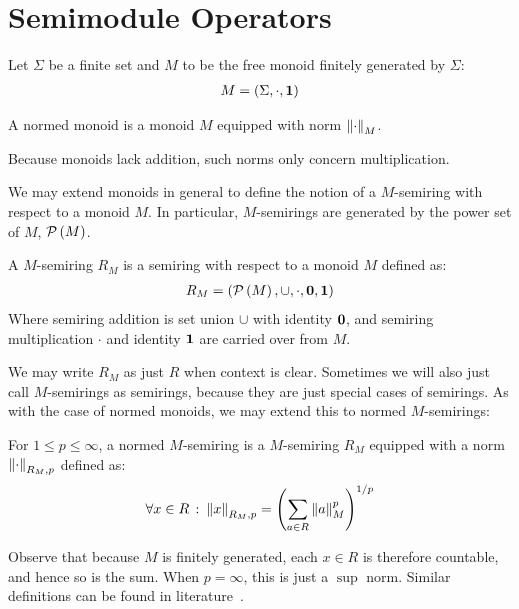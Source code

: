 
\section{Semimodule Operators}
Let \(\Sigma\) be a finite set and
\(M\) to be the free monoid finitely generated by \(\Sigma\):
\begin{align*}
  M = \left(\Sigma, \cdot, \mathbf{1}\right)
\end{align*}

\begin{definition}
  A normed monoid is a monoid \(M\) equipped with norm \(\left\lVert\cdot\right\rVert_M\).
\end{definition}

Because monoids lack addition,
such norms only concern multiplication.

We may extend monoids in general to define the notion of a \(M\)-semiring
with respect to a monoid \(M\).
In particular, \(M\)-semirings are generated by the power set of \(M\),
\(\mathcal{P}\left(M\right)\).

\begin{definition}[\(M\)-Semiring]
  A \(M\)-semiring \(R_M\) is a semiring
  with respect to a monoid \(M\) defined as:
  \begin{align*}
    R_M = \left(\mathcal{P}\left(M\right), \cup, \cdot, \mathbf{0}, \mathbf{1}\right)
  \end{align*}
  Where semiring addition is set union \(\cup\) with identity \(\mathbf{0}\),
  and semiring multiplication \(\cdot\) and identity \(\mathbf{1}\)
  are carried over from \(M\).
\end{definition}

We may write \(R_M\) as just \(R\) when context is clear.
Sometimes we will also just call \(M\)-semirings as semirings,
because they are just special cases of semirings.
As with the case of normed monoids,
we may extend this to normed \(M\)-semirings:

\begin{definition}
  For \(1 \leq p \leq \infty\),
  a normed \(M\)-semiring is a \(M\)-semiring \(R_M\)
  equipped with a norm \(\left\lVert\cdot\right\rVert_{R_M, p}\) defined as:
  \begin{align*}
    \forall x \in R \ \colon
      \left\lVert x\right\rVert_{R_M, p} = \left(\sum_{a \in R} \left\lVert a\right\rVert_M ^p\right)^{1/p}
  \end{align*}
\end{definition}

Observe that because \(M\) is finitely generated,
each \(x \in R\) is therefore countable,
and hence so is the sum.
When \(p = \infty\), this is just a \(\sup\) norm.
Similar definitions can be found in literature~\cite{kudlek2000lemmata}.


